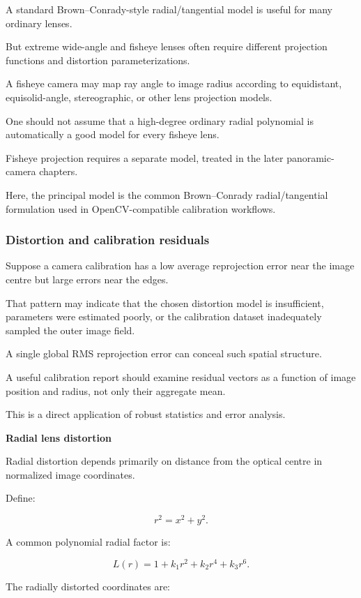 A standard Brown--Conrady-style radial/tangential model is useful for many ordinary lenses.

But extreme wide-angle and fisheye lenses often require different projection functions and distortion parameterizations.

A fisheye camera may map ray angle to image radius according to equidistant, equisolid-angle, stereographic, or other lens projection models.

One should not assume that a high-degree ordinary radial polynomial is automatically a good model for every fisheye lens.

Fisheye projection requires a separate model, treated in the later panoramic-camera chapters.

Here, the principal model is the common Brown--Conrady radial/tangential formulation used in OpenCV-compatible calibration workflows. 

\subsubsection{Distortion and calibration residuals}\label{distortion-and-calibration-residuals}

Suppose a camera calibration has a low average reprojection error near the image centre but large errors near the edges.

That pattern may indicate that the chosen distortion model is insufficient, parameters were estimated poorly, or the calibration dataset inadequately sampled the outer image field.

A single global RMS reprojection error can conceal such spatial structure.

A useful calibration report should examine residual vectors as a function of image position and radius, not only their aggregate mean.

This is a direct application of robust statistics and error analysis.

\textbf{Radial lens distortion}

Radial distortion depends primarily on distance from the optical centre in normalized image coordinates.

Define:

\[
 \boxed{ r^2=x^2+y^2 }.
\]

A common polynomial radial factor is:

\[
 \boxed{ L(r)= 1+k_1r^2+k_2r^4+k_3r^6 }.
\]

The radially distorted coordinates are:

